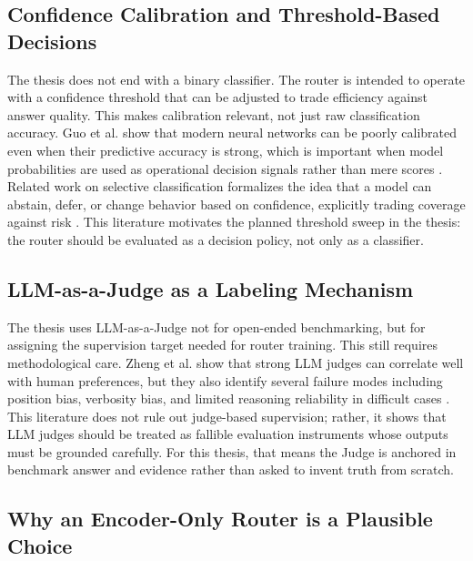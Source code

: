 \documentclass[11pt, a4paper]{article}
\begin{document}
\subsection{Confidence Calibration and Threshold-Based Decisions}

The thesis does not end with a binary classifier. The router is intended to operate with a confidence threshold that can be adjusted to trade efficiency against answer quality. This makes calibration relevant, not just raw classification accuracy. Guo et al. show that modern neural networks can be poorly calibrated even when their predictive accuracy is strong, which is important when model probabilities are used as operational decision signals rather than mere scores \cite{guo2017calibration}. Related work on selective classification formalizes the idea that a model can abstain, defer, or change behavior based on confidence, explicitly trading coverage against risk \cite{geifman2017selective}. This literature motivates the planned threshold sweep in the thesis: the router should be evaluated as a decision policy, not only as a classifier.

\subsection{LLM-as-a-Judge as a Labeling Mechanism}

The thesis uses LLM-as-a-Judge not for open-ended benchmarking, but for assigning the supervision target needed for router training. This still requires methodological care. Zheng et al. show that strong LLM judges can correlate well with human preferences, but they also identify several failure modes including position bias, verbosity bias, and limited reasoning reliability in difficult cases \cite{zheng2023llmjudge}. This literature does not rule out judge-based supervision; rather, it shows that LLM judges should be treated as fallible evaluation instruments whose outputs must be grounded carefully. For this thesis, that means the Judge is anchored in benchmark answer and evidence rather than asked to invent truth from scratch.

\subsection{Why an Encoder-Only Router is a Plausible Choice}
\end{document}

